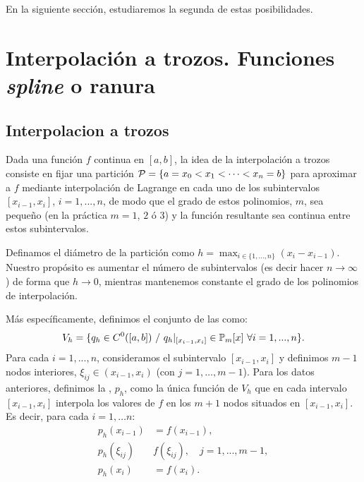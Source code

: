  En la siguiente sección, estudiaremos la segunda de estas
 posibilidades.

 \section{Interpolación a trozos. Funciones \textit{spline} o ranura}
 \label{sec:interp-trozos-splines}

 \subsection{Interpolacion a trozos}
 \label{sec:interpolacion-trozos}


 Dada una función $f$ continua en $[a,b]$, la idea de la interpolación
 a trozos consiste en fijar una partición ${\cal
   P}=\{a=x_0<x_1<\cdots<x_n=b\}$ para aproximar a $f$ mediante
 interpolación de Lagrange en cada uno de los subintervalos
 $[x_{i-1},x_{i}]$, $i=1,...,n$, de modo que el grado de estos
 polinomios, $m$, sea pequeño (en la práctica $m=1$, $2$ ó $3$) y la
 función resultante sea continua entre estos subintervalos.

 Definamos el diámetro de la partición como
 $h=\max_{i\in\{1,...,n\}}(x_i-x_{i-1})$. Nuestro propósito es aumentar
 el número de subintervalos (es decir hacer $n\to \infty$) de forma
 que $h\to 0$, mientras mantenemos constante el grado de los polinomios
 de interpolación.

 Más específicamente, definimos el conjunto de las  como:
 \begin{equation*}
   V_h = \{ q_h\in C^0([a,b]) \ /\ q_h|_{[x_{i-1},x_{i}]}\in \Pol_m[x]\
   \forall i=1,...,n \}.
 \end{equation*}
 Para cada $i=1,...,n$, consideramos el subintervalo $[x_{i-1},x_i]$ y
 definimos $m-1$ nodos interiores, $\xi_{ij}\in (x_{i-1},x_i)$ (con
 $j=1,\dots,m-1$). Para los datos anteriores, definimos la
 , $p_h$, como
 la única función de $V_h$ que en cada intervalo $[x_{i-1},x_i]$
 interpola los valores de $f$ en los $m+1$ nodos situados en $[x_{i-1},
 x_{i}]$.  Es decir, para cada $i=1,\dots n$:
 \begin{align*}
   p_h(x_{i-1})&=f(x_{i-1}),\\
   p_h(\xi_{ij})&f(\xi_{ij}), \quad j=1,...,m-1,\\
   p_h(x_i)&=f(x_i).
 \end{align*}

